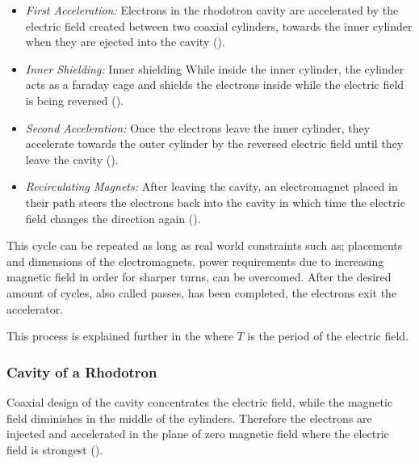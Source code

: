 \documentclass[a4paper,oneside,12pt]{report}
\numberwithin{equation}{chapter}
\begin{document}
\begin{itemize}
    \item \textit{First Acceleration:} Electrons in the rhodotron cavity are accelerated by the electric field created between two coaxial cylinders, towards the inner cylinder when they are ejected into the cavity ().
    \item \textit{Inner Shielding:} Inner shielding While inside the inner cylinder, the cylinder acts as a faraday cage and shields the electrons inside while the electric field is being reversed (). 
    \item \textit{Second Acceleration:} Once the electrons leave the inner cylinder, they accelerate towards the outer cylinder by the reversed electric field until they leave the cavity (). 
    \item \textit{Recirculating Magnets:} After leaving the cavity, an electromagnet placed in their path steers the electrons back into the cavity in which time the electric field changes the direction again (). 
\end{itemize}

This cycle can be repeated as long as real world constraints such as; placements and dimensions of the electromagnets, power requirements due to increasing magnetic field in order for sharper turns, can be overcomed.
After the desired amount of cycles, also called passes, has been completed, the electrons exit the accelerator.

This process is explained further in the  where $T$ is the period of the electric field.

\subsubsection{\hspace{4pt}Cavity of a Rhodotron}\hspace{4pt} \label{sec:cavity_of_a_rhodotron}
Coaxial design of the cavity concentrates the electric field, while the magnetic field diminishes in the middle of the cylinders. 
Therefore the electrons are injected and accelerated in the plane of zero magnetic field where the electric field is strongest ().
\end{document}

